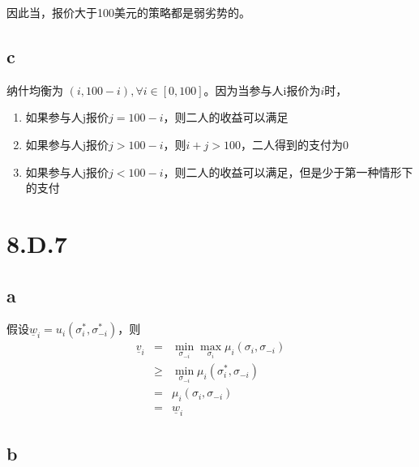 \documentclass[a4paper,12pt]{ctexart}
\begin{document}
因此当，报价大于100美元的策略都是弱劣势的。

\subsection{c}

纳什均衡为 $(i,100-i),\forall i\in[0,100]$。因为当参与人i报价为$i$时，
\begin{enumerate}
    \item 如果参与人j报价$j=100-i$，则二人的收益可以满足
    \item 如果参与人j报价$j>100-i$，则$i+j>100$，二人得到的支付为0
    \item 如果参与人j报价$j<100-i$，则二人的收益可以满足，但是少于第一种情形下的支付
\end{enumerate}

\section{8.D.7}

\subsection{a}

假设$\underline{w}_i=u_i(\sigma_i^*,\sigma_{-i}^*)$，则
\begin{eqnarray}
    \underline{v}_i&=&\min_{\sigma_{-i}}\max_{\sigma_i} \mu_i(\sigma_i,\sigma_{-i})\nonumber\\
    &\ge& \min_{\sigma_{-i}}\mu_i(\sigma_i^*,\sigma_{-i})\nonumber\\
    &=& \mu_i(\sigma_i,\sigma_{-i})\nonumber\\
    &=& \underline{w}_i \label{eq0}
\end{eqnarray}

\subsection{b}
\end{document}
